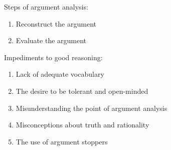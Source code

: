 Steps of argument analysis:
\begin{enumerate}
	\item Reconstruct the argument
	\item Evaluate the argument
\end{enumerate}

Impediments to good reasoning:
\begin{enumerate}
	\item Lack of adequate vocabulary
	\item The desire to be tolerant and open-minded
	\item Misunderstanding the point of argument analysis
	\item Misconceptions about truth and rationality
	\item The use of argument stoppers
\end{enumerate}
